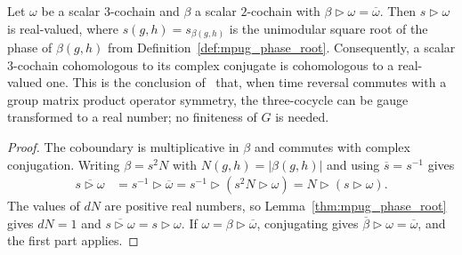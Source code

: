 \begin{lemma}
    \label{thm:mpug_time_reversal_real_anomaly}
    \leanok
    Let $\omega$ be a scalar $3$-cochain and $\beta$ a scalar $2$-cochain with
    $\beta\mathbin{\triangleright}\omega=\overline\omega$. Then
    $s\mathbin{\triangleright}\omega$ is real-valued, where
    $s(g,h)=s_{\beta(g,h)}$ is the unimodular square root of the phase of
    $\beta(g,h)$ from Definition~\ref{def:mpug_phase_root}. Consequently, a
    scalar $3$-cochain cohomologous to its complex conjugate is cohomologous
    to a real-valued one. This is the conclusion
    of~\cite[Section~4.3]{GarreRubio2023MPOSym} that, when time reversal
    commutes with a group matrix product operator symmetry, the three-cocycle
    can be gauge transformed to a real number; no finiteness of $G$ is
    needed.
\end{lemma}

\begin{proof}\leanok
    The coboundary is multiplicative in $\beta$ and commutes with complex
    conjugation. Writing $\beta=s^2N$ with $N(g,h)=|\beta(g,h)|$ and using
    $\overline s=s^{-1}$ gives
    \begin{align}
        \overline{s\mathbin{\triangleright}\omega}
         & =s^{-1}\mathbin{\triangleright}\overline\omega
        =s^{-1}\mathbin{\triangleright}(s^2N\mathbin{\triangleright}\omega)
        =N\mathbin{\triangleright}(s\mathbin{\triangleright}\omega).
    \end{align}
    The values of $dN$ are positive real numbers, so
    Lemma~\ref{thm:mpug_phase_root} gives $dN=1$ and
    $\overline{s\mathbin{\triangleright}\omega}
        =s\mathbin{\triangleright}\omega$. If
    $\omega=\beta\mathbin{\triangleright}\overline\omega$, conjugating gives
    $\overline\beta\mathbin{\triangleright}\omega=\overline\omega$, and the
    first part applies.
\end{proof}

